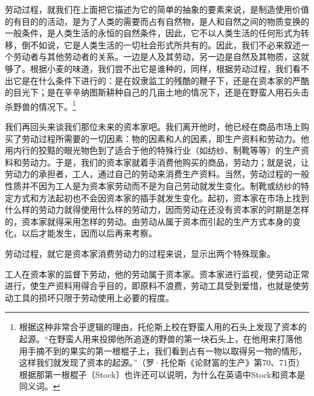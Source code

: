 \documentclass{ctexbook}
\begin{document}
    劳动过程，就我们在上面把它描述为它的简单的抽象的要素来说，是制造使用价值的有目的的活动，是为了人类的需要而占有自然物，是人和自然之间的物质变换的一般条件，是人类生活的永恒的自然条件，因此，它不以人类生活的任何形式为转移，倒不如说，它是人类生活的一切社会形式所共有的。因此，我们不必来叙述一个劳动者与其他劳动者的关系。一边是人及其劳动，另一边是自然及其物质，这就够了。根据小麦的味道，我们尝不出它是谁种的，同样，根据劳动过程，我们看不出它是在什么条件下进行的：是在奴隶监工的残酷的鞭子下，还是在资本家的严酷的目光下；是在辛辛纳图斯耕种自己的几亩土地的情况下，还是在野蛮人用石头击杀野兽的情况下。\footnote{根据这种非常合乎逻辑的理由，托伦斯上校在野蛮人用的石头上发现了资本的起源。“在野蛮人用来投掷他所追逐的野兽的第一块石头上，在他用来打落他用手摘不到的果实的第一根棍子上，我们看到占有一物以取得另一物的情形，这样我们就发现了资本的起源。”（罗·托伦斯《论财富的生产》第70、71页）根据那第一根棍子〔Stock〕也许还可以说明，为什么在英语中Stock和资本是同义词。}

    我们再回头来谈我们那位未来的资本家吧。我们离开他时，他已经在商品市场上购买了劳动过程所需要的一切因素：物的因素和人的因素，即生产资料和劳动力。他用内行的狡黠的眼光物色到了适合于他的特殊行业（如纺纱、制靴等等）的生产资料和劳动力。于是，我们的资本家就着手消费他购买的商品，劳动力；就是说，让劳动力的承担者，工人，通过自己的劳动来消费生产资料。当然，劳动过程的一般性质并不因为工人是为资本家劳动而不是为自己劳动就发生变化。制靴或纺纱的特定方式和方法起初也不会因资本家的插手就发生变化。起初，资本家在市场上找到什么样的劳动力就得使用什么样的劳动力，因而劳动在还没有资本家的时期是怎样的，资本家就得采用怎样的劳动。由劳动从属于资本而引起的生产方式本身的变化，以后才能发生，因而以后再来考察。

    劳动过程，就它是资本家消费劳动力的过程来说，显示出两个特殊现象。

    工人在资本家的监督下劳动，他的劳动属于资本家。资本家进行监视，使劳动正常进行，使生产资料用得合乎目的，即原料不浪费，劳动工具受到爱惜，也就是使劳动工具的损坏只限于劳动使用上必要的程度。
\end{document}
